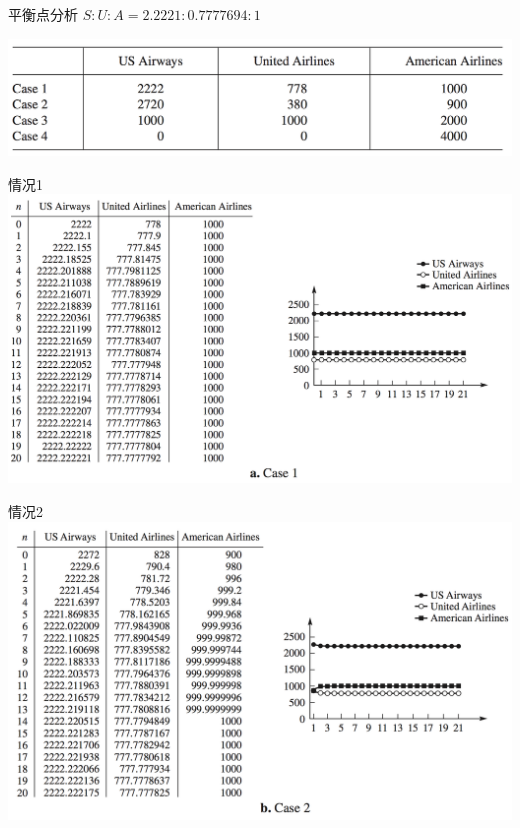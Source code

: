 \documentclass[
  ignorenonframetext,
]{ctexbeamer}
\begin{document}
\begin{frame}{平衡点分析}
\label{ux5e73ux8861ux70b9ux5206ux6790-1}
\(S:U:A = 2.2221:0.7777694:1\)

\includegraphics{party-case.png}
\end{frame}

\begin{frame}{情况1}
\label{ux60c5ux51b51-1}
\includegraphics{party-1.png}
\end{frame}

\begin{frame}{情况2}
\label{ux60c5ux51b52-1}
\includegraphics{party-2.png}
\end{frame}
\end{document}
